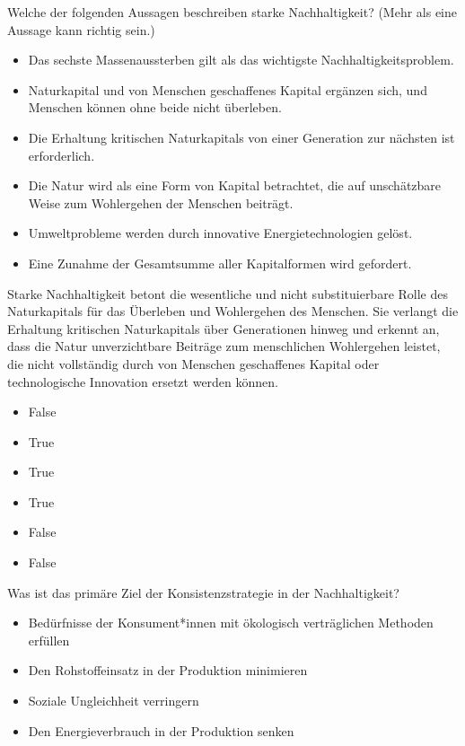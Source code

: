 \documentclass[
  nswissgerman,
  a4paper,
  DIV=11,
  numbers=noendperiod,
  oneside,
  openany]{scrreprt}
\providecommand{\tightlist}{%
  \setlength{\itemsep}{0pt}\setlength{\parskip}{0pt}}
\begin{document}
Welche der folgenden Aussagen beschreiben starke Nachhaltigkeit? (Mehr
als eine Aussage kann richtig sein.)

\begin{itemize}
\tightlist
\item[$\square$]
  Das sechste Massenaussterben gilt als das wichtigste
  Nachhaltigkeitsproblem.
\item[$\square$]
  Naturkapital und von Menschen geschaffenes Kapital ergänzen sich, und
  Menschen können ohne beide nicht überleben.
\item[$\square$]
  Die Erhaltung kritischen Naturkapitals von einer Generation zur
  nächsten ist erforderlich.
\item[$\square$]
  Die Natur wird als eine Form von Kapital betrachtet, die auf
  unschätzbare Weise zum Wohlergehen der Menschen beiträgt.
\item[$\square$]
  Umweltprobleme werden durch innovative Energietechnologien gelöst.
\item[$\square$]
  Eine Zunahme der Gesamtsumme aller Kapitalformen wird gefordert.
\end{itemize}

Starke Nachhaltigkeit betont die wesentliche und nicht substituierbare
Rolle des Naturkapitals für das Überleben und Wohlergehen des Menschen.
Sie verlangt die Erhaltung kritischen Naturkapitals über Generationen
hinweg und erkennt an, dass die Natur unverzichtbare Beiträge zum
menschlichen Wohlergehen leistet, die nicht vollständig durch von
Menschen geschaffenes Kapital oder technologische Innovation ersetzt
werden können.

\begin{itemize}
\tightlist
\item
  False
\item
  True
\item
  True
\item
  True
\item
  False
\item
  False
\end{itemize}

Was ist das primäre Ziel der Konsistenzstrategie in der Nachhaltigkeit?

\begin{itemize}
\tightlist
\item[$\square$]
  Bedürfnisse der Konsument*innen mit ökologisch verträglichen Methoden
  erfüllen
\item[$\square$]
  Den Rohstoffeinsatz in der Produktion minimieren
\item[$\square$]
  Soziale Ungleichheit verringern
\item[$\square$]
  Den Energieverbrauch in der Produktion senken
\end{itemize}
\end{document}
